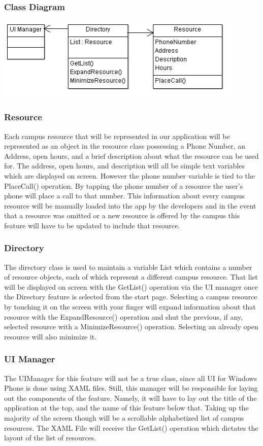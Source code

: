 \documentclass[pdftex,12pt,letter]{article}
\begin{document}
\subsubsection{Class Diagram}
\begin{flushleft}
\includegraphics[width=120mm]{DirectoryCD.png}
\end{flushleft}
\subsubsection{Resource}
Each campus resource that will be represented in our application will be represented as an object in the resource class possessing a Phone Number, an Address, open hours, and a brief description about what the resource can be used for. The address, open hours, and description will all be simple text variables which are displayed on screen. However the phone number variable is tied to the PlaceCall() operation. By tapping the phone number of a resource the user’s phone will place a call to that number. This information about every campus resource will be manually loaded into the app by the developers and in the event that a resource was omitted or a new resource is offered by the campus this feature will have to be updated to include that resource. 
\subsubsection{Directory}
The directory class is used to maintain a variable List which contains a number of resource objects, each of which represent a different campus resource. That list will be displayed on screen with the GetList() operation via the UI manager once the Directory feature is selected from the start page. Selecting a campus resource by touching it on the screen with your finger will expand information about that resource with the ExpandResource() operation and shut the previous, if any, selected resource with a MinimizeResource() operation. Selecting an already open resource will also minimize it.
\subsubsection{UI Manager}
The UIManager for this feature will not be a true class, since all UI for Windows Phone is done using XAML files. Still, this manager will be responsible for laying out the components of the feature. Namely, it will have to lay out the title of the application at the top, and the name of this feature below that. Taking up the majority of the screen though will be a scrollable alphabetized list of campus resources. The XAML File will receive the GetList() operation which dictates the layout of the list of resources.
\end{document}
